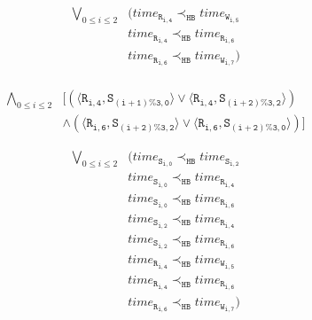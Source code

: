 \newsavebox{\boxPOInfinite}
\begin{lrbox}{\boxPOInfinite}
\begin{minipage}[t]{0.55\linewidth}
\large
\begin{align*}
\bigvee_{0 \leq i \leq 2} & (\mathit{time}_\mathtt{R_{i,4}} \prec_\mathtt{HB} \mathit{time}_\mathtt{W_{i,5}}\\
                                     & \mathit{time}_\mathtt{R_{i,4}} \prec_\mathtt{HB} \mathit{time}_\mathtt{R_{i,6}}\\
                                     & \mathit{time}_\mathtt{R_{i,6}} \prec_\mathtt{HB} \mathit{time}_\mathtt{W_{i,7}})\\
\end{align*}
\end{minipage}
\end{lrbox}

\newsavebox{\boxMPInfinite}
\begin{lrbox}{\boxMPInfinite}
\begin{minipage}[t]{0.55\linewidth}
\large
\begin{align*}
\bigwedge_{0 \leq i \leq 2} & [(\langle\mathtt{R_{i,4}},\mathtt{S_{(i+1)\%3,0}}\rangle \vee\langle\mathtt{R_{i,4}},\mathtt{S_{(i+2) \% 3,2}}\rangle)\\
                                          & \wedge(\langle\mathtt{R_{i,6}},\mathtt{S_{(i+2)\%3,2}}\rangle \vee \langle\mathtt{R_{i,6}},\mathtt{S_{(i+2)\%3,0}}\rangle)]
\end{align*}
\end{minipage}
\end{lrbox}

\newsavebox{\boxPOZero}
\begin{lrbox}{\boxPOZero}
\begin{minipage}[t]{0.55\linewidth}
\large
\begin{align*}
\bigvee_{0 \leq i \leq 2} & (\mathit{time}_\mathtt{S_{i,0}}\prec_\mathtt{HB} \mathit{time}_\mathtt{S_{i,2}}\\
				   & \mathit{time}_\mathtt{S_{i,0}} \prec_\mathtt{HB} \mathit{time}_\mathtt{R_{i,4}}\\
				   & \mathit{time}_\mathtt{S_{i,0}} \prec_\mathtt{HB} \mathit{time}_\mathtt{R_{i,6}}\\
				   & \mathit{time}_\mathtt{S_{i,2}} \prec_\mathtt{HB} \mathit{time}_\mathtt{R_{i,4}}\\
				   & \mathit{time}_\mathtt{S_{i,2}} \prec_\mathtt{HB} \mathit{time}_\mathtt{R_{i,6}}\\
				   & \mathit{time}_\mathtt{R_{i,4}} \prec_\mathtt{HB} \mathit{time}_\mathtt{W_{i,5}}\\
                                     & \mathit{time}_\mathtt{R_{i,4}} \prec_\mathtt{HB} \mathit{time}_\mathtt{R_{i,6}}\\
                                     & \mathit{time}_\mathtt{R_{i,6}} \prec_\mathtt{HB} \mathit{time}_\mathtt{W_{i,7}})
\end{align*}
\end{minipage}
\end{lrbox}

